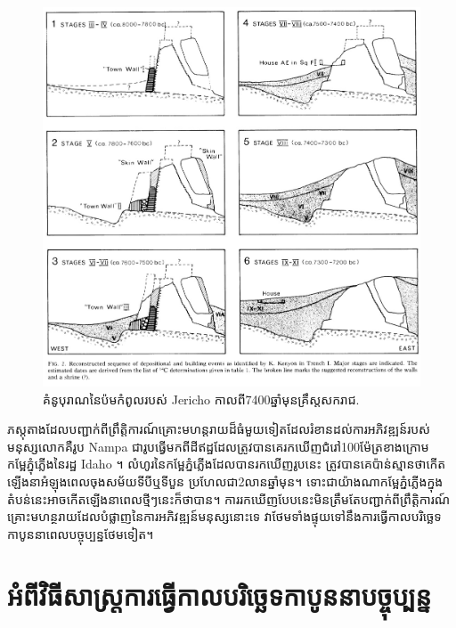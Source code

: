 \documentclass[10pt,twocolumn,letterpaper]{article}
\begin{document}
\begin{figure}[t]
\begin{center}

   \includegraphics[width=1\linewidth]{jericho.jpg}
\end{center}
   \caption{គំនូបុរាណនៃប៉មកំពូលរបស់ Jericho កាលពី7400ឆ្នាំមុនគ្រឹស្តសករាជ\cite{95}.}
\label{fig:14}
\label{fig:onecol}
\end{figure}

ភស្តុតាងដែលបញ្ជាក់ពីព្រឹត្តិការណ៍គ្រោះមហន្តរាយដ៏ធំមួយទៀតដែលរំខានដល់ការអភិវឌ្ឍន៍របស់មនុស្សលោកគឺរូប Nampa ជារូបធ្វើមកពីដីឥដ្ឋដែលត្រូវបានគេរកឃើញជំរៅ100ម៉ែត្រខាងក្រោមកម្អែភ្នុំភ្លើងនៃរដ្ឋ Idaho \cite{102,103}។ លំហូរនៃកម្អែភ្នំភ្លើងដែលបានរកឃើញរូបនេះ ត្រូវបានគេប៉ាន់ស្មានថាកើតឡើងនាអំឡុងពេលចុងសម័យទីបីឬទីបួន ប្រហែលជា2លានឆ្នាំមុន។ ទោះជាយ៉ាងណាកម្អែភ្នំភ្លើងក្នុងតំបន់នេះអាចកើតឡើងនាពេលថ្មីៗនេះក៏ថាបាន។ ការរកឃើញបែបនេះមិនត្រឹមតែបញ្ជាក់ពីព្រឹត្តិការណ៍គ្រោះមហន្ថរាយដែលបំផ្លាញនៃការអភិវឌ្ឍន៍មនុស្សនោះទេ វាថែមទាំងផ្ទុយទៅនឹងការធ្វើកាលបរិច្ឆេទកាបូននាពេលបច្ចុប្បន្នថែមទៀត។

\section{អំពីវិធីសាស្ត្រការធ្វើកាលបរិច្ឆេទកាបូននាបច្ចុប្បន្ន}
\end{document}
